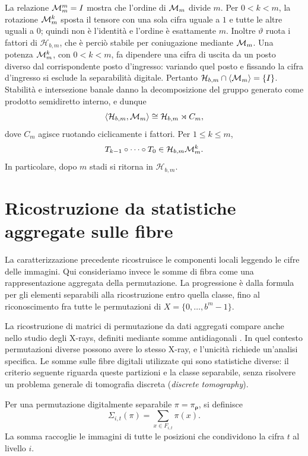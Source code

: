 \begin{remark}
		La relazione \(\mathcal M_m^m=I\) mostra che l'ordine di \(\mathcal M_m\) divide
		\(m\). Per \(0<k<m\), la rotazione \(\mathcal M_m^k\) sposta il tensore
		con una sola cifra uguale a \(1\) e tutte le altre uguali a \(0\);
		quindi non è l'identità e l'ordine è esattamente \(m\).
		Inoltre \(\vartheta\) ruota i fattori di \(\mathcal H_{b,m}\), che è
		perciò stabile per coniugazione mediante \(\mathcal M_m\). Una potenza
		\(\mathcal M_m^k\), con \(0<k<m\), fa dipendere una cifra di uscita da un
		posto diverso dal corrispondente posto d'ingresso: variando quel posto e
		fissando la cifra d'ingresso si esclude la separabilità digitale. Pertanto
		\(\mathcal H_{b,m}\cap\langle\mathcal M_m\rangle=\{I\}\).
		Stabilità e intersezione banale danno la decomposizione del gruppo generato
		come prodotto semidiretto interno, e dunque
		\[
		\langle\mathcal H_{b,m},\mathcal M_m\rangle
		\cong\mathcal H_{b,m}\rtimes C_m,
		\]
		dove \(C_m\) agisce ruotando ciclicamente i fattori. Per
		\(1\le k\le m\),
		\[
				T_{k-1}\circ\cdots\circ T_0
		\in
		\mathcal H_{b,m}\mathcal M_m^k.
		\]
		In particolare, dopo \(m\) stadi si ritorna in
		\(\mathcal H_{b,m}\).
	\end{remark}

\section{Ricostruzione da statistiche aggregate sulle fibre}

	La caratterizzazione precedente ricostruisce le componenti locali leggendo le
	cifre delle immagini. Qui consideriamo invece le somme di fibra come una
	rappresentazione aggregata della permutazione. La progressione è dalla
	formula per gli elementi separabili alla ricostruzione entro quella classe,
	fino al riconoscimento fra tutte le permutazioni di \(X=\{0,\dots,b^m-1\}\).

	La ricostruzione di matrici di permutazione da dati aggregati compare anche
	nello studio degli X-rays, definiti mediante somme antidiagonali
	\cite{bebeacua-et-al}. In quel contesto permutazioni diverse possono avere
	lo stesso X-ray, e l'unicità richiede un'analisi specifica. Le somme sulle
	fibre digitali utilizzate qui sono statistiche diverse: il criterio seguente
	riguarda queste partizioni e la classe separabile, senza risolvere un problema
	generale di tomografia discreta (\emph{discrete tomography}).

	Per una permutazione digitalmente separabile
	\(\pi=\pi_{\boldsymbol{\rho}}\), si definisce
	\[
	\Sigma_{i,t}(\pi)
	=
	\sum_{x\in F_{i,t}}\pi(x).
	\]
	La somma raccoglie le immagini di tutte le posizioni che condividono la cifra
	\(t\) al livello \(i\).

